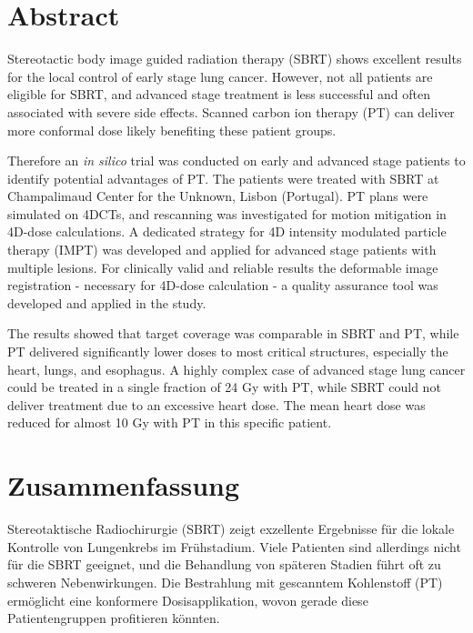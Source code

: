 \section*{Abstract}


Stereotactic body image guided radiation therapy (SBRT) shows excellent results for the local control of early stage lung cancer. 
However, not all patients are eligible for SBRT, and advanced stage treatment is less successful and often associated with severe side effects. 
Scanned carbon ion therapy (PT) can deliver more conformal dose likely benefiting these patient groups.

Therefore an \textit{in silico} trial was conducted on early and advanced stage patients to identify potential advantages of PT. 
The patients were treated with SBRT at Champalimaud Center for the Unknown, Lisbon (Portugal). PT plans were simulated on 4DCTs, 
and rescanning was investigated for motion mitigation in 4D-dose calculations. A dedicated strategy for 4D intensity modulated particle therapy (IMPT)
was developed and applied for advanced stage patients with multiple lesions. For clinically valid and reliable results the deformable 
image registration - necessary for 4D-dose calculation - a quality assurance tool was developed and applied in the study.

The results showed that target coverage was comparable in SBRT and PT, while PT delivered significantly lower doses to 
most critical structures, especially the heart, lungs, and esophagus. A highly complex case of advanced stage lung cancer 
could be treated in a single fraction of 24 Gy with PT, while SBRT could not deliver treatment due to an excessive heart dose. 
The mean heart dose was reduced for almost 10 Gy with PT in this specific patient.





\section*{Zusammenfassung}

Stereotaktische Radiochirurgie (SBRT) zeigt exzellente Ergebnisse f\"{u}r die lokale Kontrolle von 
Lungenkrebs im Fr\"{u}hstadium. Viele Patienten sind allerdings nicht f\"{u}r die SBRT geeignet, und die 
Behandlung von sp\"{a}teren Stadien f\"{u}hrt oft zu schweren Nebenwirkungen. Die Bestrahlung mit gescanntem 
Kohlenstoff (PT) erm\"{o}glicht eine konformere Dosisapplikation, wovon gerade diese Patientengruppen 
profitieren k\"{o}nnten.


